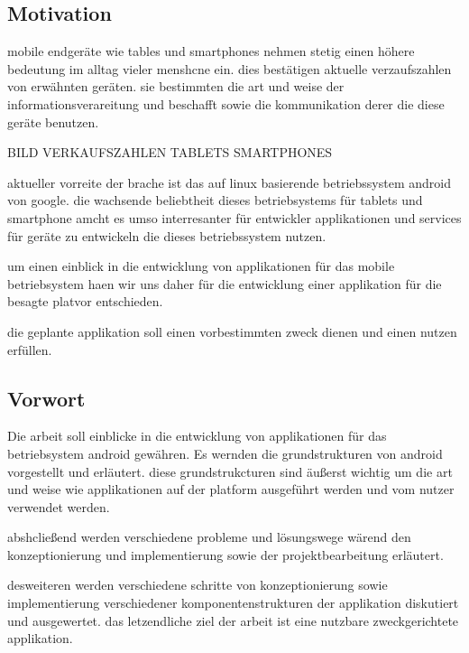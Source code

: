 \subsection{Motivation}
mobile endgeräte wie tables und smartphones nehmen stetig einen höhere bedeutung im alltag vieler menshcne ein. dies bestätigen aktuelle verzaufszahlen von erwähnten geräten. sie bestimmten die art und weise der informationsverareitung und beschafft sowie die kommunikation derer die diese geräte benutzen.

BILD VERKAUFSZAHLEN TABLETS SMARTPHONES

aktueller vorreite der brache ist das auf linux basierende betriebssystem android von google. die wachsende beliebtheit dieses betriebsystems für tablets und smartphone amcht es umso interresanter für entwickler applikationen und services für geräte zu entwickeln die dieses betriebssystem nutzen.

um einen einblick in die entwicklung von applikationen für das mobile betriebsystem haen wir uns daher für die entwicklung einer applikation für die besagte platvor entschieden.

die geplante applikation soll einen vorbestimmten zweck dienen und einen nutzen erfüllen.

\subsection{Vorwort}
Die arbeit soll einblicke in die entwicklung von applikationen für das betriebsystem android gewähren. Es wernden die grundstrukturen von android vorgestellt und erläutert. diese grundstrukcturen sind äußerst wichtig um die art und weise wie applikationen auf der platform ausgeführt werden und vom nutzer verwendet werden.

abshcließend werden verschiedene probleme und lösungswege wärend den konzeptionierung und implementierung sowie der projektbearbeitung erläutert.

desweiteren werden verschiedene schritte von konzeptionierung sowie implementierung verschiedener komponentenstrukturen der applikation diskutiert und ausgewertet. das letzendliche ziel der arbeit ist eine nutzbare zweckgerichtete applikation.


